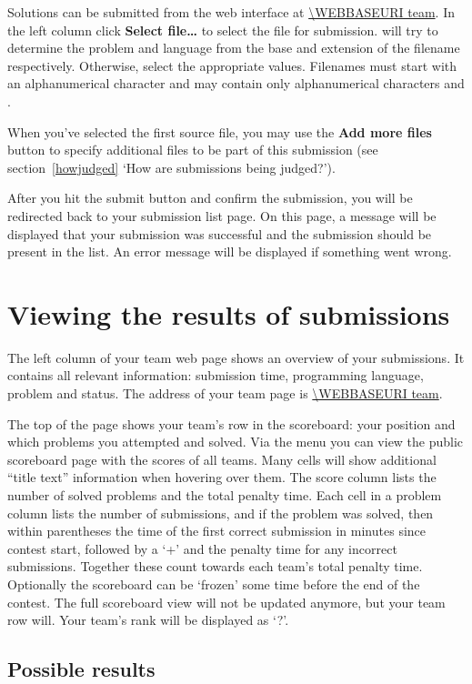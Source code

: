Solutions can be submitted from the web interface at \url{\WEBBASEURI team}.
In the left column click \textbf{Select file\ldots} to select the file for submission.
\DOMjudge will try to determine the problem and
language from the base and extension of the filename respectively.
Otherwise, select the appropriate values.
Filenames must start with an alphanumerical character and may contain only
alphanumerical characters and .

When you've selected the first source file, you may use the \textbf{Add more
files} button to specify additional files to be part of this submission (see
section~\ref{howjudged} `How are submissions being judged?').

After you hit the submit button and confirm the submission, you will
be redirected back to your submission list page. On this page, a message
will be displayed that your submission was successful and the
submission should be present in the list. An error message will be
displayed if something went wrong.

\section{Viewing the results of submissions}

The left column of your team web page shows an overview of your submissions.
It contains all relevant information: submission time, programming
language, problem and status. The address of your team page is
\url{\WEBBASEURI team}.

The top of the page shows your team's row in the scoreboard: your position and
which problems you attempted and solved. Via the menu you can view the public
scoreboard page with the scores of all teams. Many cells will show
additional ``title text'' information when hovering over them. The
score column lists the number of solved problems and the total penalty
time. Each cell in a problem column lists the number of submissions,
and if the problem was solved, then within parentheses the time of the
first correct submission in minutes since contest start, followed by a
`+' and the penalty time for any incorrect submissions. Together these
count towards each team's total penalty time. Optionally the scoreboard can
be `frozen' some time before the end of the contest. The full scoreboard view
will not be updated anymore, but your team row will. Your team's rank will
be displayed as `?'.

\subsection{Possible results}

